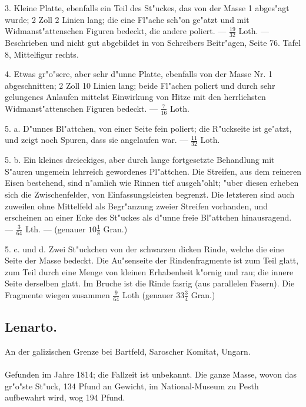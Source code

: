 \documentclass[a4paper, 11pt, oneside, polutonikogreek, german]{article}
\begin{document}
3. Kleine Platte, ebenfalls ein Teil des St"uckes, das von der Masse 1 abges"agt wurde; 2 Zoll 2 Linien lang; die eine Fl"ache sch"on ge"atzt und mit Widmanst"attenschen Figuren bedeckt, die andere poliert. --- $\frac{19}{32}$ Loth. --- Beschrieben und nicht gut abgebildet in von Schreibers Beitr"agen, Seite 76. Tafel 8, Mittelfigur rechts.

4. Etwas gr"o"sere, aber sehr d"unne Platte, ebenfalls von der Masse Nr. 1 abgeschnitten; 2 Zoll 10 Linien lang; beide Fl"achen poliert und durch sehr gelungenes Anlaufen mittelst Einwirkung von Hitze mit den herrlichsten Widmanst"attenschen Figuren bedeckt. --- $\frac{7}{16}$ Loth.

5. a. D"unnes Bl"attchen, von einer Seite fein poliert; die R"uckseite ist ge"atzt, und zeigt noch Spuren, dass sie angelaufen war. --- $\frac{11}{32}$ Loth.

5. b. Ein kleines dreieckiges, aber durch lange fortgesetzte Behandlung mit S"auren ungemein lehrreich gewordenes Pl"attchen. Die Streifen, aus dem reineren Eisen bestehend, sind n"amlich wie Rinnen tief ausgeh"ohlt; "uber diesen erheben sich die Zwischenfelder, von Einfassungsleisten begrenzt. Die letzteren sind auch zuweilen ohne Mittelfeld als Begr"anzung zweier Streifen vorhanden, und erscheinen an einer Ecke des St"uckes als d"unne freie Bl"attchen hinausragend. --- $\frac{3}{64}$ Lth. --- (genauer $10\frac{1}{8}$ Gran.)

5. c. und d. Zwei St"uckchen von der schwarzen dicken Rinde, welche die eine Seite der Masse bedeckt. Die Au"senseite der Rindenfragmente ist zum Teil glatt, zum Teil durch eine Menge von kleinen Erhabenheit k"ornig und rau; die innere Seite derselben glatt. Im Bruche ist die Rinde fasrig (aus parallelen Fasern). Die Fragmente wiegen zusammen $\frac{9}{64}$ Loth (genauer $33\frac{3}{4}$ Gran.)
\subsection{Lenarto.}
\begin{center}
\small
An der galizischen Grenze bei Bartfeld, Saroscher Komitat, Ungarn.
\end{center}
\paragraph{}
Gefunden im Jahre 1814; die Fallzeit ist unbekannt. Die ganze Masse, wovon das gr"o"ste St"uck, 134 Pfund an Gewicht, im National-Museum zu Pesth aufbewahrt wird, wog 194 Pfund.
\end{document}

